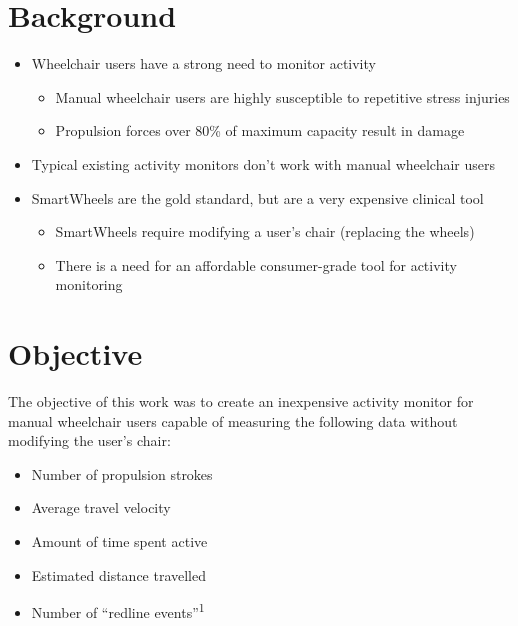 \documentclass[a0,landscape]{a0poster}
\begin{document}
\vspace{4cm}

\begin{multicols*}{3}
\large

\section*{Background}
\begin{itemize}
    \item Wheelchair users have a strong need to monitor activity
        \begin{itemize}
            \item Manual wheelchair users are highly susceptible to repetitive stress injuries \cite{big}
            \item Propulsion forces over 80\% of maximum capacity result in damage \cite{small}
        \end{itemize}
    \item Typical existing activity monitors don't work with manual wheelchair users
    \item SmartWheels are the gold standard, but are a very expensive clinical tool
        \begin{itemize}
            \item SmartWheels require modifying a user's chair (replacing the wheels)
            \item There is a need for an affordable consumer-grade tool for activity monitoring
        \end{itemize}
\end{itemize}

\section*{Objective}
The objective of this work was to create an inexpensive activity monitor for manual wheelchair users capable of measuring the following data without modifying the user's chair:

\begin{itemize}
    \item Number of propulsion strokes
    \item Average travel velocity
    \item Amount of time spent active
    \item Estimated distance travelled
    \item Number of ``redline events''\textsuperscript{1}
\end{itemize}


\end{multicols*}
\end{document}
